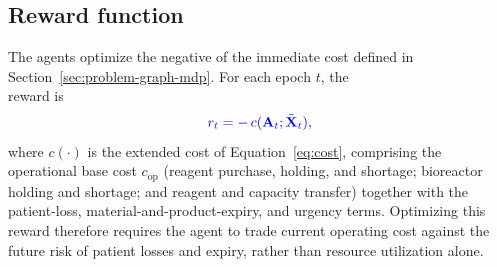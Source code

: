 \documentclass[preprint,review,12pt,nonatbib]{elsarticle}
\providecommand{\DIFadd}[1]{{\protect\color{blue}#1}} %
\providecommand{\DIFdel}[1]{} %
\providecommand{\DIFaddbegin}{} %
\providecommand{\DIFaddend}{} %
\providecommand{\DIFdelbegin}{} %
\providecommand{\DIFdelend}{} %
\providecommand{\DIFscaledelfig}{0.5}
\newlength{\DIFdelgraphicswidth} %
\newlength{\DIFdelgraphicsheight} %
\providecommand{\DIFaddincludegraphics}[2][]{{\color{blue}\fbox{\DIFOincludegraphics[#1]{#2}}}} %
\providecommand{\DIFdelincludegraphics}[2][]{%
\sbox{\DIFdelgraphicsbox}{\DIFOincludegraphics[#1]{#2}}%
\settoboxwidth{\DIFdelgraphicswidth}{\DIFdelgraphicsbox} %
\settoboxtotalheight{\DIFdelgraphicsheight}{\DIFdelgraphicsbox} %
\scalebox{\DIFscaledelfig}{%
\parbox[b]{\DIFdelgraphicswidth}{\usebox{\DIFdelgraphicsbox}\\[-\baselineskip] \rule{\DIFdelgraphicswidth}{0em}}\llap{\resizebox{\DIFdelgraphicswidth}{\DIFdelgraphicsheight}{%
\setlength{\unitlength}{\DIFdelgraphicswidth}%
\begin{picture}(1,1)%
\thicklines\linethickness{2pt} %
{\color[rgb]{1,0,0}\put(0,0){\framebox(1,1){}}}%
{\color[rgb]{1,0,0}\put(0,0){\line( 1,1){1}}}%
{\color[rgb]{1,0,0}\put(0,1){\line(1,-1){1}}}%
\end{picture}%
}\hspace*{3pt}}} %
} %
\DeclareRobustCommand{\DIFaddbegin}{\DIFOaddbegin \let\includegraphics\DIFaddincludegraphics} %
\DeclareRobustCommand{\DIFaddend}{\DIFOaddend \let\includegraphics\DIFOincludegraphics} %
\DeclareRobustCommand{\DIFdelbegin}{\DIFOdelbegin \let\includegraphics\DIFdelincludegraphics} %
\DeclareRobustCommand{\DIFdelend}{\DIFOaddend \let\includegraphics\DIFOincludegraphics} %
\begin{document}
\subsection*{Reward \DIFdelbegin \DIFdel{Function}\DIFdelend \DIFaddbegin \DIFadd{function}\DIFaddend }
The \DIFdelbegin \DIFdel{reward (negative cost) encourages policies that balance cost minimization and service-level
stability}\DIFdelend \DIFaddbegin \DIFadd{agents optimize the negative of the immediate cost defined in Section~\ref{sec:problem-graph-mdp}}\DIFaddend . For each epoch $t$, the \DIFdelbegin \DIFdel{immediate reward is
defined as
}\begin{displaymath}
\DIFdel{r_t = -\Big( C_t^{\text{reagent}} + C_t^{\text{bio}} + C_t^{\text{trans}} \Big),
}\end{displaymath}%
\DIFdelend \DIFaddbegin \DIFadd{reward is
}\begin{equation}
\DIFadd{r_t = -\,c(\mathbf{A}_t;\tilde{\mathbf{X}}_t),
}\end{equation}\DIFaddend 
where \DIFdelbegin \DIFdel{each term corresponds to the reagent, bioreactor, and transshipment cost components
introduced in Eq. ~(14). This formulation allows }\DIFdelend \DIFaddbegin \DIFadd{$c(\cdot)$ is the extended cost of Equation~\eqref{eq:cost}, comprising the operational base cost $c_{\mathrm{op}}$ (reagent purchase, holding, and shortage; bioreactor holding and shortage; and reagent and capacity transfer) together with the patient-loss, material-and-product-expiry, and urgency terms. Optimizing this reward therefore requires }\DIFaddend the agent to \DIFdelbegin \DIFdel{learn trade-offs between resource utilization and timely delivery}\DIFdelend \DIFaddbegin \DIFadd{trade current operating cost against the future risk of patient losses and expiry, rather than resource utilization alone}\DIFaddend .
\end{document}
